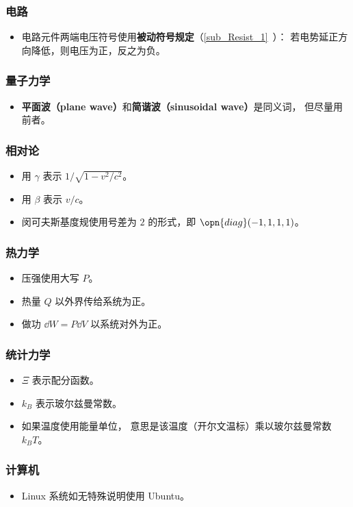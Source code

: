 \subsubsection{电路}
\begin{itemize}
\item 电路元件两端电压符号使用\textbf{被动符号规定}（\autoref{sub_Resist_1}~）： 若电势延正方向降低，则电压为正，反之为负。
\end{itemize}

\subsubsection{量子力学}
\begin{itemize}
\item \textbf{平面波（plane wave）}和\textbf{简谐波（sinusoidal wave）}是同义词， 但尽量用前者。
\end{itemize}

\subsubsection{相对论}
\begin{itemize}
\item 用 $\gamma$ 表示 $1/\sqrt{1 - v^2/c^2}$。
\item 用 $\beta$ 表示 $v/c$。
\item 闵可夫斯基度规使用号差为 $2$ 的形式，即 $\opn{diag}(-1, 1, 1, 1)$。
\end{itemize}

\subsubsection{热力学}
\begin{itemize}
\item 压强使用大写 $P$。
\item 热量 $Q$ 以外界传给系统为正。
\item 做功 $\dd{W} = P\dd{V}$ 以系统对外为正。
\end{itemize}

\subsubsection{统计力学}
\begin{itemize}
\item $\Xi$ 表示配分函数。
\item $k_B$ 表示玻尔兹曼常数。
\item 如果温度使用能量单位， 意思是该温度（开尔文温标）乘以玻尔兹曼常数 $k_B T$。
\end{itemize}

\subsubsection{计算机}
\begin{itemize}
\item Linux 系统如无特殊说明使用 Ubuntu。
\end{itemize}
